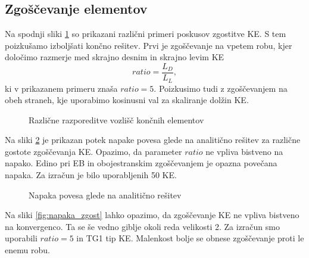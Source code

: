 
\newpage
\FloatBarrier
\subsection{Zgoščevanje elementov}

Na spodnji sliki \ref{fig:zgoščevanje} so prikazani različni primeri poskusov zgostitve KE. S tem poizkušamo izboljšati končno rešitev. Prvi je zgoščevanje na vpetem robu, kjer določimo razmerje med skrajno desnim in skrajno levim KE 
\begin{equation}
    ratio = \frac{L_{D}}{L_{L}},
\end{equation}
ki v prikazanem primeru znaša $ratio=5$. Poizkusimo tudi z zgoščevanjem na obeh straneh, kje uporabimo kosinusni val za skaliranje dolžin KE.

\begin{figure}[ht]
    \centering
    \caption{Različne razporeditve vozlišč končnih elementov}
    \label{fig:zgoščevanje}
\end{figure}

Na sliki \ref{fig:errx_zgosc} je prikazan potek napake povesa glede na analitično rešitev za različne gostote zgoščevanja KE. Opazimo, da parameter $ratio$ ne vpliva bistveno na napako. Edino pri EB in obojestranskim zgoščevanjem je opazna povečana napaka. Za izračun je bilo uporabljenih 50 KE.

\begin{figure}[ht]
    \centering
    \caption{Napaka povesa glede na analitično rešitev}
    \label{fig:errx_zgosc}
\end{figure}

Na sliki \ref{fig:napaka_zgost} lahko opazimo, da zgoščevanje KE ne vpliva bistveno na konvergenco. Ta se še vedno giblje okoli reda velikosti 2. Za izračun smo uporabili $ratio=5$ in TG1 tip KE. Malenkost bolje se obnese zgoščevanje proti le enemu robu.

